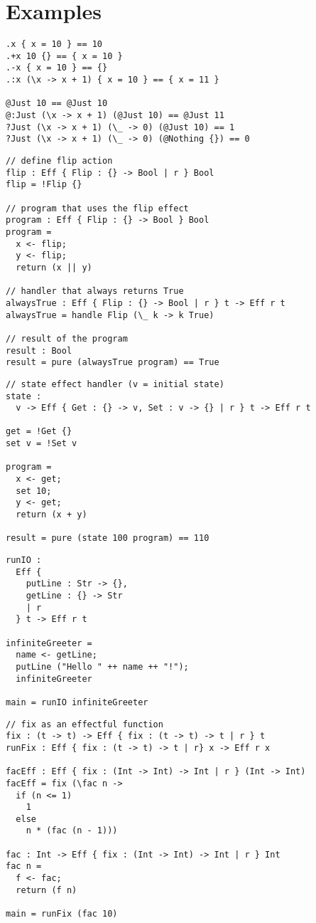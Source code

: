 \documentclass[12pt]{article}
\begin{document}
\newpage
\section{Examples}

\begin{lstlisting}[caption=Records and variants]
.x { x = 10 } == 10
.+x 10 {} == { x = 10 }
.-x { x = 10 } == {}
.:x (\x -> x + 1) { x = 10 } == { x = 11 }

@Just 10 == @Just 10
@:Just (\x -> x + 1) (@Just 10) == @Just 11
?Just (\x -> x + 1) (\_ -> 0) (@Just 10) == 1
?Just (\x -> x + 1) (\_ -> 0) (@Nothing {}) == 0
\end{lstlisting}

\begin{lstlisting}[caption=Basic effect handlers]
// define flip action
flip : Eff { Flip : {} -> Bool | r } Bool
flip = !Flip {}

// program that uses the flip effect
program : Eff { Flip : {} -> Bool } Bool
program =
  x <- flip;
  y <- flip;
  return (x || y)

// handler that always returns True
alwaysTrue : Eff { Flip : {} -> Bool | r } t -> Eff r t
alwaysTrue = handle Flip (\_ k -> k True)

// result of the program
result : Bool
result = pure (alwaysTrue program) == True
\end{lstlisting}

\newpage
\begin{lstlisting}[caption=State effect]
// state effect handler (v = initial state)
state :
  v -> Eff { Get : {} -> v, Set : v -> {} | r } t -> Eff r t

get = !Get {}
set v = !Set v

program =
  x <- get;
  set 10;
  y <- get;
  return (x + y)

result = pure (state 100 program) == 110
\end{lstlisting}

\begin{lstlisting}[caption=IO effects]
runIO :
  Eff {
    putLine : Str -> {},
    getLine : {} -> Str
    | r
  } t -> Eff r t

infiniteGreeter =
  name <- getLine;
  putLine ("Hello " ++ name ++ "!");
  infiniteGreeter

main = runIO infiniteGreeter
\end{lstlisting}

\newpage
\begin{lstlisting}[caption=Recursion effect]
// fix as an effectful function
fix : (t -> t) -> Eff { fix : (t -> t) -> t | r } t
runFix : Eff { fix : (t -> t) -> t | r} x -> Eff r x 

facEff : Eff { fix : (Int -> Int) -> Int | r } (Int -> Int)
facEff = fix (\fac n ->
  if (n <= 1)
    1
  else
    n * (fac (n - 1)))

fac : Int -> Eff { fix : (Int -> Int) -> Int | r } Int
fac n =
  f <- fac;
  return (f n)

main = runFix (fac 10)
\end{lstlisting}
\end{document}
